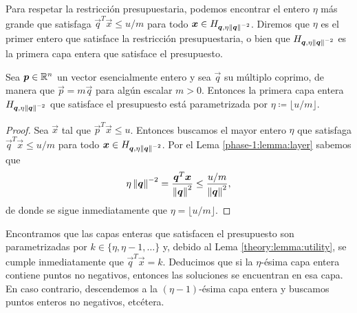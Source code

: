 Para respetar la restricción presupuestaria, podemos encontrar el entero $\eta$ más grande que
satisfaga $\vec{q}^T\vec{x} \leq u/m$ para todo $\boldsymbol{x} \in H_{\boldsymbol{q}, \eta\left\lVert \boldsymbol{q} \right\rVert^{-2}}$.
Diremos que $\eta$ es el primer entero que satisface la restricción presupuestaria, o bien que
$H_{\boldsymbol{q}, \eta\left\lVert \boldsymbol{q} \right\rVert^{-2}}$ es la primera capa entera que satisface el presupuesto.
\begin{lemma}
	\label{phase-1:lemma:eta}
	Sea $\boldsymbol{p} \in \mathbb{R}^n$ un vector esencialmente entero y sea $\vec{q}$ su múltiplo coprimo, de
	manera que $\vec{p} = m\vec{q}$ para algún escalar $m > 0$. Entonces la primera capa
	entera $H_{\boldsymbol{q}, \eta \left\lVert \boldsymbol{q} \right\rVert^{-2}}$ que satisface el presupuesto está parametrizada
	por $\eta \coloneq \lfloor u/m \rfloor$.
\end{lemma}
\begin{proof}
	Sea $\vec{x}$ tal que $\vec{p}^T\vec{x} \leq u$. Entonces buscamos el mayor entero $\eta$ que
	satisfaga $\vec{q}^T\vec{x} \leq u/m$ para todo $\boldsymbol{x} \in H_{\boldsymbol{q},
	\eta\left\lVert \boldsymbol{q} \right\rVert^{-2}}$. Por el Lema \ref{phase-1:lemma:layer} sabemos que
	\begin{equation*}
		\eta\left\lVert \boldsymbol{q} \right\rVert^{-2} = \frac{\boldsymbol{q}^T\boldsymbol{x}}{\left\lVert \boldsymbol{q} \right\rVert^2} \leq
		\frac{u/m}{\left\lVert \boldsymbol{q} \right\rVert^2},
	\end{equation*}
	de donde se sigue inmediatamente que $\eta = \lfloor u/m \rfloor$.
\end{proof}

Encontramos que las capas enteras que satisfacen el presupuesto son parametrizadas por $k \in
\lbrace \eta, \eta - 1, \ldots \rbrace$ y, debido al Lema \ref{theory:lemma:utility}, se cumple
inmediatamente que $\vec{q}^T\vec{x} = k$. Deducimos que si la $\eta$-ésima capa entera contiene
puntos no negativos, entonces las soluciones se encuentran en esa capa. En caso contrario,
descendemos a la $(\eta - 1)$-ésima capa entera y buscamos puntos enteros no negativos, etcétera.

